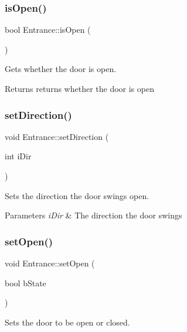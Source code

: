 \subsubsection{\texorpdfstring{is\+Open()}{isOpen()}}
{\footnotesize\ttfamily bool Entrance\+::is\+Open (\begin{DoxyParamCaption}{ }\end{DoxyParamCaption})}



Gets whether the door is open. 

\begin{DoxyReturn}{Returns}
returns whether the door is open 
\end{DoxyReturn}
\mbox{\label{class_entrance_a22dad184287d5fde6c8f04315798b9e6}} 
\subsubsection{\texorpdfstring{set\+Direction()}{setDirection()}}
{\footnotesize\ttfamily void Entrance\+::set\+Direction (\begin{DoxyParamCaption}\item[{int}]{i\+Dir }\end{DoxyParamCaption})}



Sets the direction the door swings open. 


\begin{DoxyParams}{Parameters}
{\em i\+Dir} & The direction the door swings \\
\hline
\end{DoxyParams}
\mbox{\label{class_entrance_a7cb1816675301f172ac6be0b874e5889}} 
\subsubsection{\texorpdfstring{set\+Open()}{setOpen()}}
{\footnotesize\ttfamily void Entrance\+::set\+Open (\begin{DoxyParamCaption}\item[{bool}]{b\+State }\end{DoxyParamCaption})}



Sets the door to be open or closed. 


